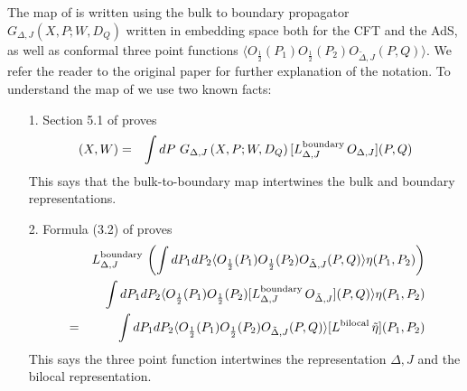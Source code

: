 \documentclass[a4paper,12pt]{article}
\def\bea{\begin{eqnarray}}
\def\eea{\end{eqnarray}}
\begin{document}
\begin{appendix}
The map of \cite{Aharony:2020omh} is written using the bulk to boundary propagator $G_{\Delta,J}\left(X,P;W,D_Q\right)$
written in embedding space both for the CFT and the AdS, as well as conformal three point functions
$\langle O_{\frac{1}{2}}(P_1)O_{\frac{1}{2}}(P_2)O_{\tilde\Delta,J}(P,Q)\rangle$. 
We refer the reader to the original paper for further explanation of the notation.
To understand the map of \cite{Aharony:2020omh} we use two known facts:
%
\begin{itemize}
\item[1.] Section 5.1 of \cite{Aizawa:2014yqa} proves
%
\bea
[L^{\rm bulk}_{\Delta,J}\,\Phi_{J}]\left(X,W\right)&=& \int dP\,\, G_{\Delta,J}\left(X,P;W,D_Q\right) 
[L^{\rm boundary}_{\Delta,J}\,O_{\Delta,J}](P,Q)
\eea
%
This says that the bulk-to-boundary map intertwines the bulk and boundary representations.
\item[2.] Formula (3.2) of \cite{Dobrev:1976vr} proves
%
\bea
&&L^{\rm boundary}_{\Delta,J}\, \left(\int dP_{1}dP_{2}
\langle O_{\frac{1}{2}}(P_1)O_{\frac{1}{2}}(P_2)O_{\tilde\Delta,J}(P,Q)\rangle \eta(P_1,P_2)\right)\cr
&&\int dP_{1}dP_{2}
\langle O_{\frac{1}{2}}(P_1)O_{\frac{1}{2}}(P_2)
[L^{\rm boundary}_{\Delta,J}\,O_{\tilde\Delta,J}](P,Q)\rangle \eta(P_1,P_2)\cr
&=&\int dP_{1}dP_{2}
\langle O_{\frac{1}{2}}(P_1)O_{\frac{1}{2}}(P_2)O_{\tilde\Delta,J}(P,Q)\rangle 
[L^{\rm bilocal}\,\tilde\eta](P_1,P_2)
\eea
%
This says the three point function intertwines the representation $\Delta,J$ and the bilocal representation.
\end{itemize}


\end{appendix}
\end{document}
